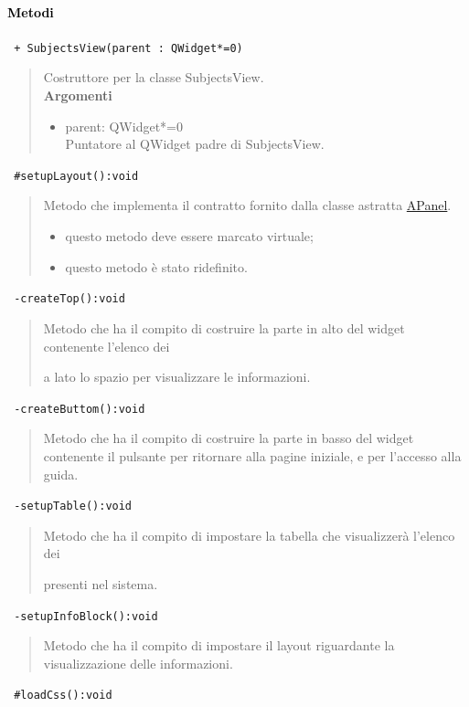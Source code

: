 \paragraph{\textcolor{black}{Metodi\\}}
\color{blue}\verb! + SubjectsView(parent : QWidget*=0)!
\begin{quote}
\color{black}Costruttore per la classe SubjectsView. \\
\textbf{Argomenti}
\begin{itemize}
\item parent: QWidget*=0  \\ Puntatore al QWidget padre di SubjectsView.
\end{itemize}
\end{quote}
\color{blue}\verb! #setupLayout():void!
\begin{quote}
\color{black} Metodo che implementa il contratto fornito dalla classe astratta \hyperref[speAPanel]{APanel}.
\begin{itemize}
\item questo metodo deve essere marcato virtuale;
\item questo metodo è stato ridefinito.
\end{itemize}
\end{quote} 
\color{blue}\verb! -createTop():void!
\begin{quote}
\color{black} Metodo che ha il compito di costruire la parte in alto del widget contenente l'elenco dei \subject e a lato lo spazio per visualizzare le informazioni.
\end{quote} 
\color{blue}\verb! -createButtom():void!
\begin{quote}
\color{black} Metodo che ha il compito di costruire la parte in basso del widget contenente il pulsante per ritornare alla pagine iniziale, e per l'accesso alla guida.
\end{quote}
\color{blue}\verb! -setupTable():void!
\begin{quote}
\color{black} Metodo che ha il compito di impostare la tabella che visualizzerà l'elenco dei \subject{} presenti nel sistema.
\end{quote}
\color{blue}\verb! -setupInfoBlock():void!
\begin{quote}
\color{black} Metodo che ha il compito di impostare il layout riguardante la visualizzazione delle informazioni.
\end{quote}
\color{blue}\verb! #loadCss():void!
